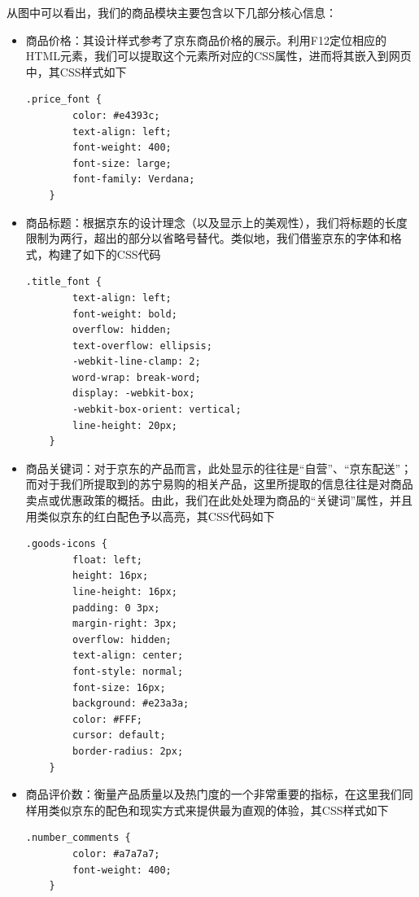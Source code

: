 \documentclass[a4paper,12pt]{article}
\begin{document}
    从图中可以看出，我们的商品模块主要包含以下几部分核心信息：
    \begin{itemize}
        \item 商品价格：其设计样式参考了京东商品价格的展示。利用F12定位相应的HTML元素，我们可以提取这个元素所对应的CSS属性，进而将其嵌入到网页中，其CSS样式如下
        
        \begin{lstlisting}[language=html]
    .price_font {
        color: #e4393c;
        text-align: left;
        font-weight: 400;
        font-size: large;
        font-family: Verdana;
    }
        \end{lstlisting}

        \item 商品标题：根据京东的设计理念（以及显示上的美观性），我们将标题的长度限制为两行，超出的部分以省略号替代。类似地，我们借鉴京东的字体和格式，构建了如下的CSS代码
        
        \begin{lstlisting}[language=html]
    .title_font {
        text-align: left;
        font-weight: bold;
        overflow: hidden;
        text-overflow: ellipsis;
        -webkit-line-clamp: 2;
        word-wrap: break-word;
        display: -webkit-box;
        -webkit-box-orient: vertical;
        line-height: 20px;
    }
        \end{lstlisting}

        \item 商品关键词：对于京东的产品而言，此处显示的往往是“自营”、“京东配送”；而对于我们所提取到的苏宁易购的相关产品，这里所提取的信息往往是对商品卖点或优惠政策的概括。由此，我们在此处处理为商品的“关键词”属性，并且用类似京东的红白配色予以高亮，其CSS代码如下
        
        \begin{lstlisting}[language=html]
    .goods-icons {
        float: left;
        height: 16px;
        line-height: 16px;
        padding: 0 3px;
        margin-right: 3px;
        overflow: hidden;
        text-align: center;
        font-style: normal;
        font-size: 16px;
        background: #e23a3a;
        color: #FFF;
        cursor: default;
        border-radius: 2px;
    }
        \end{lstlisting}

    \item 商品评价数：衡量产品质量以及热门度的一个非常重要的指标，在这里我们同样用类似京东的配色和现实方式来提供最为直观的体验，其CSS样式如下
    
    \begin{lstlisting}[language=html]
    .number_comments {
        color: #a7a7a7;
        font-weight: 400;
    }
    \end{lstlisting}


\end{itemize}
\end{document}
